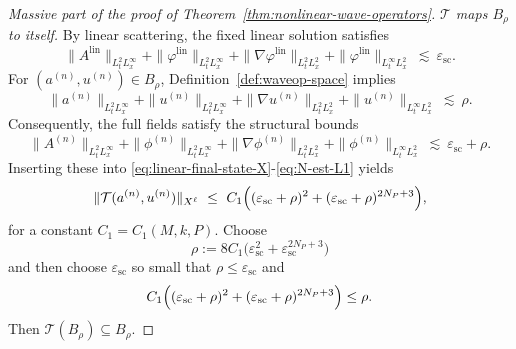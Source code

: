 \documentclass[11pt]{article}
\numberwithin{equation}{section}
\theoremstyle{plain}
\theoremstyle{definition}
\theoremstyle{remark}
\begin{document}
\begin{proof}[Massive part of the proof of Theorem~\ref{thm:nonlinear-wave-operators}]
\medskip
\noindent\textit{$\mathcal T$ maps $B_\rho$ to itself.}
By linear scattering, the fixed linear solution satisfies
\begin{equation}
\|A^{\mathrm{lin}}\|_{L^{2}_{t}L^{\infty}_{x}}
+
\|\varphi^{\mathrm{lin}}\|_{L^{2}_{t}L^{\infty}_{x}}
+
\|\nabla\varphi^{\mathrm{lin}}\|_{L^{2}_{t}L^{2}_{x}}
+
\|\varphi^{\mathrm{lin}}\|_{L^{\infty}_{t}L^{2}_{x}}
\ \lesssim\ \varepsilon_{\mathrm{sc}}.
\end{equation}
For $(a^{(n)},u^{(n)})\in B_\rho$, Definition~\ref{def:waveop-space} implies
\begin{equation}
\|a^{(n)}\|_{L^{2}_{t}L^{\infty}_{x}}
+
\|u^{(n)}\|_{L^{2}_{t}L^{\infty}_{x}}
+
\|\nabla u^{(n)}\|_{L^{2}_{t}L^{2}_{x}}
+
\|u^{(n)}\|_{L^{\infty}_{t}L^{2}_{x}}
\ \lesssim\ \rho.
\end{equation}
Consequently, the full fields satisfy the structural bounds
\begin{equation}
\|A^{(n)}\|_{L^{2}_{t}L^{\infty}_{x}}
+
\|\phi^{(n)}\|_{L^{2}_{t}L^{\infty}_{x}}
+
\|\nabla\phi^{(n)}\|_{L^{2}_{t}L^{2}_{x}}
+
\|\phi^{(n)}\|_{L^{\infty}_{t}L^{2}_{x}}
\ \lesssim\ \varepsilon_{\mathrm{sc}}+\rho.
\end{equation}
Inserting these into \eqref{eq:linear-final-state-X}-\eqref{eq:N-est-L1} yields
\begin{equation}\label{eq:T-selfmap}
\|\mathcal T(a^{(n)},u^{(n)})\|_{X^{\ell}}
\ \le\ C_{1}\Bigl((\varepsilon_{\mathrm{sc}}+\rho)^{2}+(\varepsilon_{\mathrm{sc}}+\rho)^{2N_P+3}\Bigr),
\end{equation}
for a constant $C_{1}=C_{1}(M,k,P)$.
Choose
\begin{equation}
 \rho:=8C_{1}\bigl(\varepsilon_{\mathrm{sc}}^{2}+\varepsilon_{\mathrm{sc}}^{2N_P+3}\bigr)
\end{equation}
and then choose $\varepsilon_{\mathrm{sc}}$ so small that $\rho\le\varepsilon_{\mathrm{sc}}$ and
\begin{equation}
 C_{1}\Bigl((\varepsilon_{\mathrm{sc}}+\rho)^{2}+(\varepsilon_{\mathrm{sc}}+\rho)^{2N_P+3}\Bigr)\le\rho.
\end{equation}
Then $\mathcal T(B_\rho)\subseteq B_\rho$.


\end{proof}
\end{document}
